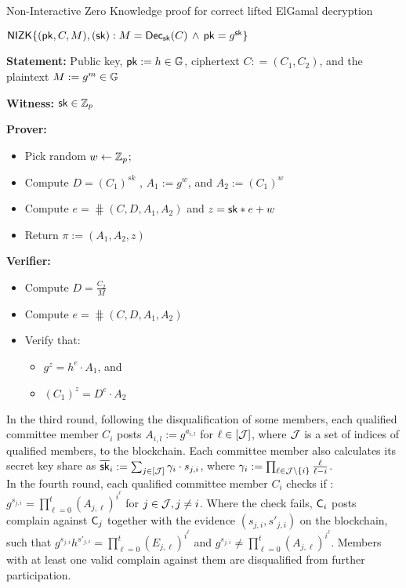 \begin{boxfig}{\label{fig:ElgamalDecrNIZK}Non-Interactive Zero Knowledge proof for correct lifted ElGamal decryption}{}
\begin{center}
$\mathsf{NIZK}\{(\mathsf{pk}, C, M ),(\mathsf{sk}): M = \mathsf{Dec}_{\mathsf{sk}}(C) \, \wedge \, \mathsf{pk} = g^{\mathsf{sk}}\}$
\end{center}

\textbf{Statement:} Public key, $\mathsf{pk}:=h \in\mathbb{G}$,  ciphertext $C: =(C_1, C_2 )$, and the plaintext $M:=g^m \in\mathbb{G}$

\textbf{Witness:} $\mathsf{sk}\in\mathbb{Z}_p$

\medskip
\textbf{Prover:}
\begin{itemize}
\item Pick random $w \leftarrow  {\mathbb{Z}_p}$; 
\item Compute $D=(C_1)^{sk}$ , $A_1 := g^w$, and $A_2 := (C_1)^w $
\item Compute $e = \hash(C,D,A_1,A_2)$ and  $ z = \mathsf{sk}*e + w$
\item Return $\pi:=(A_1,A_2,z)$
\end{itemize}

\textbf{Verifier:}
\begin{itemize}
\item Compute $D=\frac{C_2}{M}$
\item Compute $e = \hash(C,D,A_1,A_2)$
\item Verify that:
    \begin{itemize}
    \item $g^z = h^e \cdot A_1$, and
    \item $(C_1)^{z} = D^e \cdot A_2$ 
    \end{itemize}
\end{itemize}
\end{boxfig}

In the third round, following the disqualification of some members, each qualified committee member $C_i$ posts $A_{i,l} := g^{a_{i,l}}$ for $ \ell \in [\mathcal{J}] $, where $\mathcal{J}$ is a set of indices of qualified members, to the blockchain. Each committee member also calculates its secret key share as $\overline{\mathsf{sk}}_i := \sum_{j\in[\mathcal{J}]} \gamma_{i} \cdot s_{j,i}$, where $\gamma_{i}:= \prod_{\ell\in \mathcal{J}\setminus \{i\} } \frac{\ell}{\ell-i}$.\\

In the fourth round, each qualified committee member $C_i$ checks  if : $g^{s_{j,i}}= \prod_{\ell=0}^{t} (A_{j,\ell})^{i^\ell}$ for $j\in\mathcal{J}, j\neq i$. Where the check fails, $\mathsf{C}_i$ posts complain against $\mathsf{C}_j$ together with the evidence $(s_{j,i},s'_{j,i})$ on the blockchain, such that $g^{s_{j,i}}h^{s'_{j,i}}= \prod_{\ell=0}^{t} (E_{j,\ell})^{i^\ell}$ and $g^{s_{j,i}}\neq  \prod_{\ell=0}^{t} (A_{j,\ell})^{i^\ell}$. Members with at least one valid complain against them are disqualified from further participation. \\

